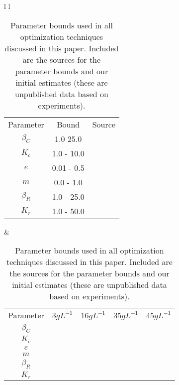 \documentclass[twocolumn, 12pt]{article}
\begin{document}



\onecolumn
\begin{table}[ht]

    \caption{Parameter bounds used in all optimization techniques discussed in this paper. Included are the sources for the parameter bounds and our initial estimates (these are unpublished data based on experiments).}
    \begin{tabular}{l l}
    	\label{table:Bounds} %
        	\begin{tabular}{c c c}
            \cline{1-3}
        	Parameter & Bound & Source \\
            \cline{1-3}
        	$\beta_C$ & 1.0 25.0 & \cite{fussmann_crossing_2000}  \\
            $K_c$ & 1.0 - 10.0 & \\
            $e$ & 0.01 - 0.5 & \\
            $m$ & 0.0 - 1.0 & \\
            $\beta_R$ & 1.0 - 25.0  & \\
            $K_r$ & 1.0 - 50.0 & \\
            \cline{1-3}
    	\end{tabular}
    	&
    	\label{table:InitEsts} %
        	\begin{tabular}{c c c c c}
            \cline{1-5}
        	Parameter & 3$gL^{-1}$ & 16$gL^{-1}$ & 35$gL^{-1}$& 45$gL^{-1}$ \\
            \cline{1-5}
        	$\beta_C$ & & & & \\
            $K_c$ & & & & \\
            $e$ & & & & \\
            $m$ & & & & \\
            $\beta_R$ & & & & \\
            $K_r$ & & & & \\
            \cline{1-5}
    	\end{tabular}
    	
    \end{tabular}
\end{table}
\end{document}
